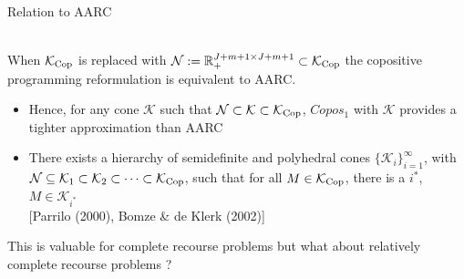 \documentclass[xcolor=x11names,compress]{beamer}
\renewcommand{\(}{\begin{columns}}
\renewcommand{\)}{\end{columns}}
\newcommand{\<}[1]{\begin{column}{#1}}
\renewcommand{\>}{\end{column}}
\newcommand{\0}{\V{0}}
\newcommand{\1}{\V{1}}
\newcommand{\mymbox}[1]{\mbox{\scriptsize #1}}
\renewcommand{\Re}{\mathbb{R}}
\newcommand{\N}{\mathcal{N}}
\newcommand{\copconeCopos}{\mathcal{K}_{\mymbox{Cop}}}
\begin{document}
\begin{frame}{Relation to AARC}

\begin{theorem}
\vspace{-0.5cm}\hspace{2.5cm}{\footnotesize [Xu \& Burer (2016)]}\\
When  $\copconeCopos$ is replaced with $\N:=\Re_+^{J+m+1\times J+m+1}\subset \copconeCopos$ the copositive programming reformulation is equivalent to AARC.
\end{theorem}

\begin{itemize}
\pause\item Hence, for any cone $\mathcal{K}$ such that $\N\subset \mathcal{K} \subset \copconeCopos$, $Copos_1$ with $\mathcal{K}$ provides a tighter approximation than AARC
\item There exists a hierarchy of semidefinite and polyhedral cones $\{ \mathcal{K}_i \}_{i=1}^\infty$, with  $\N\subseteq \mathcal{K}_1 \subset \mathcal{K}_2 \subset \dots \subset \copconeCopos$, such that for all $M\in \copconeCopos$, there is a $i^*$, $M\in \mathcal{K}_{i^*}$\\
{\footnotesize [Parrilo (2000), Bomze \& de Klerk (2002)]}

\end{itemize}
\pause\vspace{0.5cm} This is valuable for complete recourse problems but what about relatively complete recourse problems ?

\end{frame}

\end{document}

